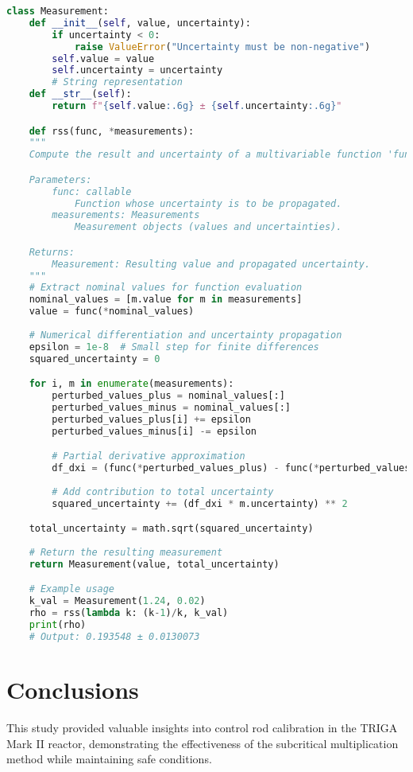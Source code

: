 \newpage
\begin{lstlisting}[language=Python]
    class Measurement:
    def __init__(self, value, uncertainty):
        if uncertainty < 0:
            raise ValueError("Uncertainty must be non-negative")
        self.value = value
        self.uncertainty = uncertainty
        # String representation
    def __str__(self):
        return f"{self.value:.6g} ± {self.uncertainty:.6g}"

    def rss(func, *measurements):
    """
    Compute the result and uncertainty of a multivariable function 'func' using finite differences.

    Parameters:
        func: callable
            Function whose uncertainty is to be propagated.
        measurements: Measurements
            Measurement objects (values and uncertainties).

    Returns:
        Measurement: Resulting value and propagated uncertainty.
    """
    # Extract nominal values for function evaluation
    nominal_values = [m.value for m in measurements]
    value = func(*nominal_values)
    
    # Numerical differentiation and uncertainty propagation
    epsilon = 1e-8  # Small step for finite differences
    squared_uncertainty = 0

    for i, m in enumerate(measurements):
        perturbed_values_plus = nominal_values[:]
        perturbed_values_minus = nominal_values[:]
        perturbed_values_plus[i] += epsilon
        perturbed_values_minus[i] -= epsilon

        # Partial derivative approximation
        df_dxi = (func(*perturbed_values_plus) - func(*perturbed_values_minus)) / (2 * epsilon)
        
        # Add contribution to total uncertainty
        squared_uncertainty += (df_dxi * m.uncertainty) ** 2

    total_uncertainty = math.sqrt(squared_uncertainty)
    
    # Return the resulting measurement
    return Measurement(value, total_uncertainty)

    # Example usage
    k_val = Measurement(1.24, 0.02)
    rho = rss(lambda k: (k-1)/k, k_val)
    print(rho) 
    # Output: 0.193548 ± 0.0130073

\end{lstlisting}


\section{Conclusions}
This study provided valuable insights into control rod calibration in the TRIGA Mark II reactor, 
demonstrating the effectiveness of the subcritical multiplication method while maintaining safe conditions. 

